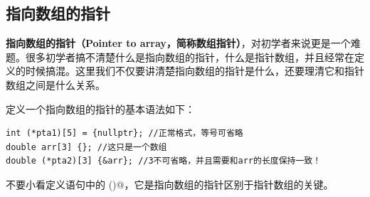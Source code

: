 \subsection*{指向数组的指针}
\textbf{指向数组的指针（Pointer to array，简称数组指针）}，对初学者来说更是一个难题。很多初学者搞不清楚什么是指向数组的指针，什么是指针数组，并且经常在定义的时候搞混。这里我们不仅要讲清楚指向数组的指针是什么，还要理清它和指针数组之间是什么关系。\par
定义一个指向数组的指针的基本语法如下：
\begin{lstlisting}
int (*pta1)[5] = {nullptr}; //正常格式，等号可省略
double arr[3] {}; //这只是一个数组
double (*pta2)[3] {&arr}; //3不可省略，并且需要和arr的长度保持一致！
\end{lstlisting}
不要小看定义语句中的 \lstinline@()@，它是指向数组的指针区别于指针数组的关键。\par

